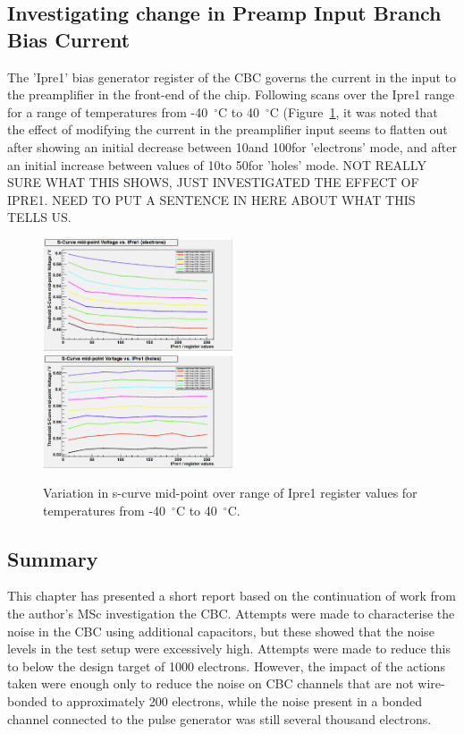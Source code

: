 \subsection{Investigating change in Preamp Input Branch Bias Current}
\label{ss:investigating_change_in_preamp_input_branch_bias_current}
The 'Ipre1' bias generator register of the CBC governs the current in the input to the preamplifier in the
front-end of the chip. Following scans over the Ipre1 range for a range of temperatures from -40~$^{\circ}$C
to 40~$^{\circ}$C (Figure~\ref{fig:midpoint_v_ipre1}, it was noted that the effect of modifying the current in
the preamplifier input seems to flatten out after showing an initial decrease between 10\uA and 100\uA for
'electrons' mode, and after an initial increase between values of 10\uA to 50\uA for 'holes' mode. NOT REALLY
SURE WHAT THIS SHOWS, JUST INVESTIGATED THE EFFECT OF IPRE1. NEED TO PUT A SENTENCE IN HERE ABOUT WHAT THIS
TELLS US.

\begin{figure}[hbtp]
   \centering
     \includegraphics[width=0.5\textwidth]{Chapters/07_Appendices/07c_2_Images/scurve_midpoint_v_ipre1_electrons}\hfill
     \includegraphics[width=0.5\textwidth]{Chapters/07_Appendices/07c_2_Images/scurve_midpoint_v_ipre1_holes}
     \caption{Variation in s-curve mid-point over range of Ipre1 register values for temperatures from
     -40~$^{\circ}$C to 40~$^{\circ}$C.}
     \label{fig:midpoint_v_ipre1}
\end{figure}

\subsection{Summary}
\label{ss:summary}
This chapter has presented a short report based on the continuation of work from the author's MSc
investigation the CBC. Attempts were made to characterise the noise in the CBC using additional capacitors,
but these showed that the noise levels in the test setup were excessively high. Attempts were made to reduce this to below
the design target of 1000 electrons. However, the impact of the actions taken were enough only to reduce the
noise on CBC channels that are not wire-bonded to approximately 200 electrons, while the noise present in a
bonded channel connected to the pulse generator was still several thousand electrons. 

